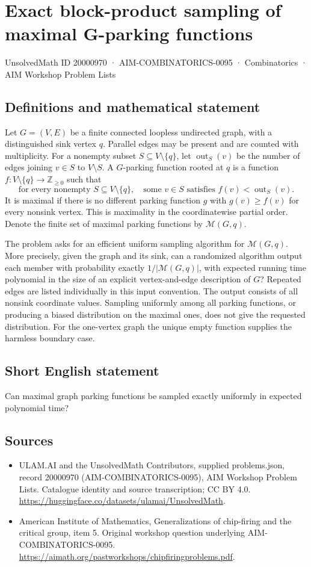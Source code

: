\documentclass[11pt,a4paper]{article}
\begin{document}
\section*{Exact block-product sampling of maximal G-parking functions}\label{20000970}
{\small UnsolvedMath ID 20000970 · AIM-COMBINATORICS-0095 · Combinatorics · AIM Workshop Problem Lists}
\subsection{Definitions and mathematical statement}
Let $G=(V,E)$ be a finite connected loopless undirected graph, with a
distinguished sink vertex $q$. Parallel edges may be present and are
counted with multiplicity. For a nonempty subset $S\subseteq V\setminus\{q\}$,
let $\operatorname{out}_S(v)$ be the number of edges joining $v\in S$
to $V\setminus S$. A $G$-parking function rooted at $q$ is a function
$f:V\setminus\{q\}\to\mathbb Z_{\ge0}$ such that
\[
 \text{for every nonempty }S\subseteq V\setminus\{q\},\quad
 \text{some }v\in S\text{ satisfies }f(v)<\operatorname{out}_S(v).
\]
It is maximal if there is no different parking function $g$ with
$g(v)\ge f(v)$ for every nonsink vertex. This is maximality in the
coordinatewise partial order. Denote the finite set of maximal parking
functions by $\mathcal M(G,q)$.

The problem asks for an efficient uniform sampling algorithm for
$\mathcal M(G,q)$. More precisely, given the graph and its sink, can a
randomized algorithm output each member with probability exactly
$1/|\mathcal M(G,q)|$, with expected running time polynomial in the
size of an explicit vertex-and-edge description of $G$? Repeated edges
are listed individually in this input convention. The output consists
of all nonsink coordinate values. Sampling uniformly among all parking
functions, or producing a biased distribution on the maximal ones,
does not give the requested distribution. For the one-vertex graph
the unique empty function supplies the harmless boundary case.
\subsection{Short English statement}
Can maximal graph parking functions be sampled exactly uniformly in expected polynomial time?
\subsection{Sources}
\begin{itemize}
\item[S1] ULAM.AI and the UnsolvedMath Contributors, supplied problems.json, record 20000970 (AIM-COMBINATORICS-0095), AIM Workshop Problem Lists. Catalogue identity and source transcription; CC BY 4.0.
\url{https://huggingface.co/datasets/ulamai/UnsolvedMath}.
\item[S2] American Institute of Mathematics, Generalizations of chip-firing and the critical group, item 5. Original workshop question underlying AIM-COMBINATORICS-0095.
\url{https://aimath.org/pastworkshops/chipfiringproblems.pdf}.
\end{itemize}
\end{document}
